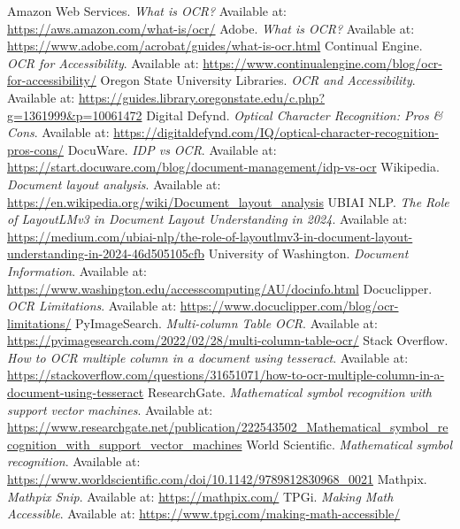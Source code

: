 \begin{thebibliography}{99}
 Amazon Web Services. \textit{What is OCR?} Available at: \url{https://aws.amazon.com/what-is/ocr/}
 Adobe. \textit{What is OCR?} Available at: \url{https://www.adobe.com/acrobat/guides/what-is-ocr.html}
 Continual Engine. \textit{OCR for Accessibility}. Available at: \url{https://www.continualengine.com/blog/ocr-for-accessibility/}
 Oregon State University Libraries. \textit{OCR and Accessibility}. Available at: \url{https://guides.library.oregonstate.edu/c.php?g=1361999&p=10061472}
 Digital Defynd. \textit{Optical Character Recognition: Pros \& Cons}. Available at: \url{https://digitaldefynd.com/IQ/optical-character-recognition-pros-cons/}
 DocuWare. \textit{IDP vs OCR}. Available at: \url{https://start.docuware.com/blog/document-management/idp-vs-ocr}
 Wikipedia. \textit{Document layout analysis}. Available at: \url{https://en.wikipedia.org/wiki/Document_layout_analysis}
 UBIAI NLP. \textit{The Role of LayoutLMv3 in Document Layout Understanding in 2024}. Available at: \url{https://medium.com/ubiai-nlp/the-role-of-layoutlmv3-in-document-layout-understanding-in-2024-46d505105cfb}
 University of Washington. \textit{Document Information}. Available at: \url{https://www.washington.edu/accesscomputing/AU/docinfo.html}
 Docuclipper. \textit{OCR Limitations}. Available at: \url{https://www.docuclipper.com/blog/ocr-limitations/}
 PyImageSearch. \textit{Multi-column Table OCR}. Available at: \url{https://pyimagesearch.com/2022/02/28/multi-column-table-ocr/}
 Stack Overflow. \textit{How to OCR multiple column in a document using tesseract}. Available at: \url{https://stackoverflow.com/questions/31651071/how-to-ocr-multiple-column-in-a-document-using-tesseract}
 ResearchGate. \textit{Mathematical symbol recognition with support vector machines}. Available at: \url{https://www.researchgate.net/publication/222543502_Mathematical_symbol_recognition_with_support_vector_machines}
 World Scientific. \textit{Mathematical symbol recognition}. Available at: \url{https://www.worldscientific.com/doi/10.1142/9789812830968_0021}
 Mathpix. \textit{Mathpix Snip}. Available at: \url{https://mathpix.com/}
 TPGi. \textit{Making Math Accessible}. Available at: \url{https://www.tpgi.com/making-math-accessible/}

\end{thebibliography}
